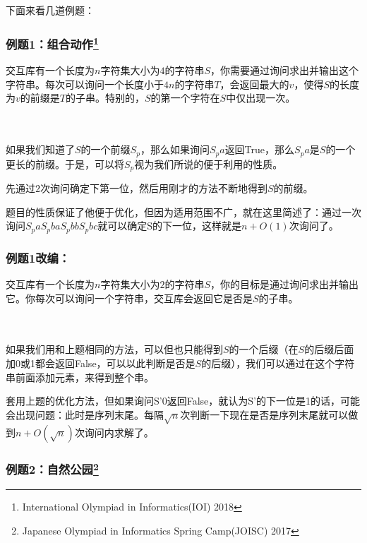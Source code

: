 \documentclass{noithesis}
\begin{document}
下面来看几道例题：

\subsubsection{例题1：组合动作\footnote{International Olympiad in Informatics(IOI) 2018}}

交互库有一个长度为$n$字符集大小为$4$的字符串$S$，你需要通过询问求出并输出这个字符串。每次可以询问一个长度小于$4n$的字符串$T$，会返回最大的$v$，使得$S$的长度为$v$的前缀是$T$的子串。特别的，$S$的第一个字符在$S$中仅出现一次。

\paragraph{}\

如果我们知道了$S$的一个前缀$S_p$，那么如果询问$S_pa$返回True，那么$S_pa$是$S$的一个更长的前缀。于是，可以将$S_p$视为我们所说的便于利用的性质。

先通过$2$次询问确定下第一位，然后用刚才的方法不断地得到$S$的前缀。

题目的性质保证了他便于优化，但因为适用范围不广，就在这里简述了：通过一次询问$S_paS_pbaS_pbbS_pbc$就可以确定S的下一位，这样就是$n+O(1)$次询问了。

\subsubsection{例题1改编：}

交互库有一个长度为$n$字符集大小为$2$的字符串$S$，你的目标是通过询问求出并输出它。你每次可以询问一个字符串，交互库会返回它是否是$S$的子串。

\paragraph{}\

如果我们用和上题相同的方法，可以但也只能得到$S$的一个后缀（在$S$的后缀后面加0或1都会返回False，可以以此判断是否是$S$的后缀），我们可以通过在这个字符串前面添加元素，来得到整个串。

套用上题的优化方法，但如果询问S'0返回False，就认为S'的下一位是1的话，可能会出现问题：此时是序列末尾。每隔$\sqrt n$次判断一下现在是否是序列末尾就可以做到$n+O(\sqrt n)$次询问内求解了。

\subsubsection{例题2：自然公园\footnote{Japanese Olympiad in Informatics Spring Camp(JOISC) 2017}}
\end{document}
